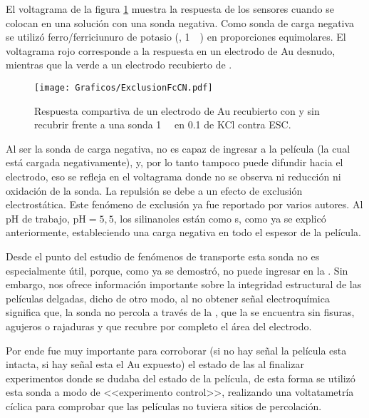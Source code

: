 	 El voltagrama de la figura \ref{fig:exclusion_vs_Au} muestra la respuesta de los sensores cuando se colocan en una solución con una sonda negativa. Como sonda de carga negativa se utilizó ferro/ferriciunuro de potasio (\ferroferri, \SI{1}{\milli\Molar}) en proporciones equimolares. El voltagrama rojo corresponde a la respuesta en un electrodo de Au desnudo, mientras que la verde a un electrodo recubierto de \pdm.
	
			\begin{figure}[ht]
				\centering
		 	    \texttt{[image: Graficos/ExclusionFcCN.pdf]}
		        \caption[Exclusión electrostática]{Respuesta compartiva de un electrodo de Au recubierto con \pdmF\space y sin recubrir frente a una sonda \ferroferri \SI{1}{\milli\Molar} en \SI{0.1}{\Molar} de KCl contra ESC.}
		        \label{fig:exclusion_vs_Au}
		      	\end{figure}
	
	 Al ser la sonda de carga negativa, no es capaz de ingresar a la película (la cual está cargada negativamente), y, por lo tanto tampoco puede difundir hacia el electrodo, eso se refleja en el voltagrama donde no se observa ni reducción ni oxidación de la sonda. La repulsión se debe a un efecto de exclusión electrostática. Este fenómeno de exclusión ya fue reportado por varios autores\cite{alberti2015,schmuhl2005,Andrieu-Brunsen2015,brunsen2011}. Al pH de trabajo, $\text{pH}=5,5$, los silinanoles están como s, como ya se explicó anteriormente, estableciendo una carga negativa en todo el espesor de la película.

	 Desde el punto del estudio de fenómenos de  transporte esta sonda no es especialmente útil, porque, como ya se demostró, no puede ingresar en la \pdm. Sin embargo, nos ofrece información importante sobre la integridad estructural de las películas delgadas, dicho de otro modo, al no obtener señal electroquímica significa que, la sonda no percola a través de la \pdm, que la \pdm\space se encuentra sin fisuras, agujeros o rajaduras y que recubre por completo el área del electrodo.

	 Por ende fue muy importante para corroborar (si no hay señal la película esta intacta, si hay señal esta el Au expuesto) el estado de las \pdm\space al finalizar experimentos donde se dudaba del estado de la película, de esta forma se utilizó esta sonda a modo de <<experimento control>>, realizando una voltatametría cíclica para comprobar que las películas no tuviera sitios de percolación.


